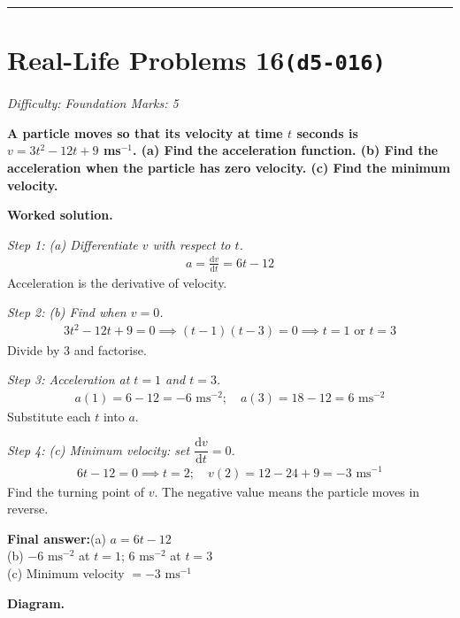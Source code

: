 \documentclass[11pt]{article}
\newcommand{\question}[1]{\par\medskip\noindent\textbf{#1}\par}
\begin{document}
\medskip\hrule

\section*{Real-Life Problems 16\quad\small\texttt{(d5-016)}}
\textit{Difficulty: Foundation \quad\textbar\quad Marks: 5}

\question{A particle moves so that its velocity at time \( t \) seconds is \( v = 3t^2 - 12t + 9 \) ms\(^{-1}\). (a) Find the acceleration function. (b) Find the acceleration when the particle has zero velocity. (c) Find the minimum velocity.}

\textbf{Worked solution.}

\textit{Step 1: (a) Differentiate \( v \) with respect to \( t \).}
\[\begin{gathered}
a = \frac{\mathrm{d}v}{\mathrm{d}t} = 6t - 12
\end{gathered}\]
Acceleration is the derivative of velocity.

\textit{Step 2: (b) Find when \( v = 0 \).}
\[\begin{gathered}
3t^2 - 12t + 9 = 0 \implies (t-1)(t-3) = 0 \implies t = 1 \text{ or } t = 3
\end{gathered}\]
Divide by 3 and factorise.

\textit{Step 3: Acceleration at \( t = 1 \) and \( t = 3 \).}
\[\begin{gathered}
a(1) = 6-12 = -6 \text{ ms}^{-2}; \quad a(3) = 18-12 = 6 \text{ ms}^{-2}
\end{gathered}\]
Substitute each \( t \) into \( a \).

\textit{Step 4: (c) Minimum velocity: set \( \dfrac{\mathrm{d}v}{\mathrm{d}t} = 0 \).}
\[\begin{gathered}
6t - 12 = 0 \implies t = 2; \quad v(2) = 12 - 24 + 9 = -3 \text{ ms}^{-1}
\end{gathered}\]
Find the turning point of \( v \). The negative value means the particle moves in reverse.

\begin{answerbox}
\textbf{Final answer:}\quad (a) \(\displaystyle  a = 6t - 12 \) \\[3pt]  (b) \(\displaystyle  -6 \text{ ms}^{-2} \) at \(\displaystyle  t=1 \); \(\displaystyle  6 \text{ ms}^{-2} \) at \(\displaystyle  t=3 \) \\[3pt]  (c) Minimum velocity \(\displaystyle  = -3 \text{ ms}^{-1} \)
\end{answerbox}
\textbf{Diagram.}
\end{document}
